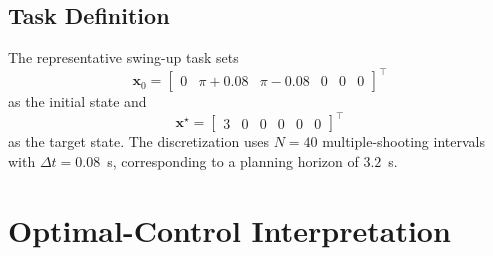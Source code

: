 \documentclass[conference]{IEEEtran}
\begin{document}
\subsection{Task Definition}
The representative swing-up task sets
\begin{equation}
\bm{x}_0 = \begin{bmatrix} 0 & \pi + 0.08 & \pi - 0.08 & 0 & 0 & 0 \end{bmatrix}^\top
\end{equation}
as the initial state and
\begin{equation}
\bm{x}^\star = \begin{bmatrix} 3 & 0 & 0 & 0 & 0 & 0 \end{bmatrix}^\top
\end{equation}
as the target state. The discretization uses $N=40$ multiple-shooting intervals with $\Delta t = 0.08$~s, corresponding to a planning horizon of $3.2$~s.

\section{Optimal-Control Interpretation}
\end{document}

